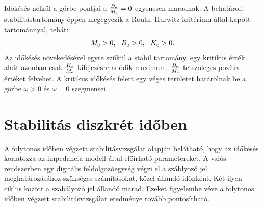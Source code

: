 Időkésés nélkül a görbe pontjai a \(\frac{B_{\mathrm{e}}}{M_{\mathrm{e}}} = 0\) egyenesen maradnak.
A behatárolt stabilitástartomány éppen megegyezik a Routh--Hurwitz kritérium által 
kapott tartománnyal, tehát:
\begin{equation}
    M_{\mathrm{e}} > 0,~~B_{\mathrm{e}} > 0,~~K_{\mathrm{e}} > 0.
\end{equation}
Az időkésés növekedésével egyre szűkül a stabil tartomány, egy kritikus érték alatt azonban
csak \(\frac{K_{\mathrm{e}}}{M_{\mathrm{e}}}\) kifejezésre adódik maximum, \(\frac{B_{\mathrm{e}}}{M_{\mathrm{e}}}\)
tetszőleges pozítív értéket felvehet. A kritikus időkésés felett egy véges területet határolnak be 
a görbe \(\omega > 0\) és \(\omega = 0\) szegmensei. 

\section{Stabilitás diszkrét időben}
A folytonos időben végzett stabilitásvizsgálat alapján belátható, hogy az 
időkésés korlátozza az impedancia modell által előírható paramétereket.
A valós rendszerben egy digitális feldolgozóegység végzi el a száblyozó jel
meghatározásához szükséges számításokat, közel állandó időnként. Két ilyen 
ciklus között a szabályozó jel állandó marad. Ezeket figyelembe véve a 
folytonos időben végzett stabilitásvizsgálat eredménye tovább pontosítható.
